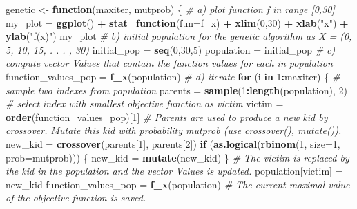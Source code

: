 \documentclass[
]{article}
\newenvironment{Shaded}{\begin{snugshade}}{\end{snugshade}}
\newcommand{\CommentTok}[1]{\textcolor[rgb]{0.56,0.35,0.01}{\textit{#1}}}
\newcommand{\ControlFlowTok}[1]{\textcolor[rgb]{0.13,0.29,0.53}{\textbf{#1}}}
\newcommand{\DataTypeTok}[1]{\textcolor[rgb]{0.13,0.29,0.53}{#1}}
\newcommand{\DecValTok}[1]{\textcolor[rgb]{0.00,0.00,0.81}{#1}}
\newcommand{\KeywordTok}[1]{\textcolor[rgb]{0.13,0.29,0.53}{\textbf{#1}}}
\newcommand{\NormalTok}[1]{#1}
\newcommand{\OperatorTok}[1]{\textcolor[rgb]{0.81,0.36,0.00}{\textbf{#1}}}
\newcommand{\StringTok}[1]{\textcolor[rgb]{0.31,0.60,0.02}{#1}}
\begin{document}
\begin{Shaded}
\begin{Highlighting}[]
{\NormalTok{genetic <-}\StringTok{ }\ControlFlowTok{function}\NormalTok{(maxiter, mutprob) \{}
  \CommentTok{# a) plot function f in range [0,30]}
\NormalTok{  my_plot =}\StringTok{ }\KeywordTok{ggplot}\NormalTok{() }\OperatorTok{+}\StringTok{ }\KeywordTok{stat_function}\NormalTok{(}\DataTypeTok{fun=}\NormalTok{f_x) }\OperatorTok{+}\StringTok{ }\KeywordTok{xlim}\NormalTok{(}\DecValTok{0}\NormalTok{,}\DecValTok{30}\NormalTok{) }\OperatorTok{+}\StringTok{ }\KeywordTok{xlab}\NormalTok{(}\StringTok{"x"}\NormalTok{) }\OperatorTok{+}\StringTok{ }\KeywordTok{ylab}\NormalTok{(}\StringTok{"f(x)"}\NormalTok{)}
\NormalTok{  my_plot}
  \CommentTok{# b) initial population for the genetic algorithm as X = (0, 5, 10, 15, . . . , 30)}
\NormalTok{  initial_pop =}\StringTok{ }\KeywordTok{seq}\NormalTok{(}\DecValTok{0}\NormalTok{,}\DecValTok{30}\NormalTok{,}\DecValTok{5}\NormalTok{)}
\NormalTok{  population =}\StringTok{ }\NormalTok{initial_pop}
  \CommentTok{# c) compute vector Values that contain the function values for each in population}
\NormalTok{  function_values_pop =}\StringTok{ }\KeywordTok{f_x}\NormalTok{(population)}
  \CommentTok{# d) iterate}
  \ControlFlowTok{for}\NormalTok{ (i }\ControlFlowTok{in} \DecValTok{1}\OperatorTok{:}\NormalTok{maxiter) \{}
    \CommentTok{# sample two indexes from population}
\NormalTok{    parents =}\StringTok{ }\KeywordTok{sample}\NormalTok{(}\DecValTok{1}\OperatorTok{:}\KeywordTok{length}\NormalTok{(population), }\DecValTok{2}\NormalTok{)}
    \CommentTok{# select index with smallest objective function as victim}
\NormalTok{    victim =}\StringTok{ }\KeywordTok{order}\NormalTok{(function_values_pop)[}\DecValTok{1}\NormalTok{]}
    \CommentTok{# Parents are used to produce a new kid by crossover. Mutate this kid with probability mutprob (use crossover(), mutate()).}
\NormalTok{    new_kid =}\StringTok{ }\KeywordTok{crossover}\NormalTok{(parents[}\DecValTok{1}\NormalTok{], parents[}\DecValTok{2}\NormalTok{])}
    \ControlFlowTok{if}\NormalTok{ (}\KeywordTok{as.logical}\NormalTok{(}\KeywordTok{rbinom}\NormalTok{(}\DecValTok{1}\NormalTok{, }\DataTypeTok{size=}\DecValTok{1}\NormalTok{, }\DataTypeTok{prob=}\NormalTok{mutprob))) \{}
\NormalTok{      new_kid =}\StringTok{ }\KeywordTok{mutate}\NormalTok{(new_kid) }
\NormalTok{    \}}
    \CommentTok{# The victim is replaced by the kid in the population and the vector Values is updated.}
\NormalTok{    population[victim] =}\StringTok{ }\NormalTok{new_kid}
\NormalTok{    function_values_pop =}\StringTok{ }\KeywordTok{f_x}\NormalTok{(population)}
    \CommentTok{# The current maximal value of the objective function is saved.}
}
\end{Highlighting}
\end{Shaded}
\end{document}
